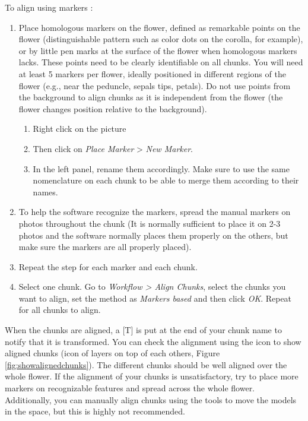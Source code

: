 \documentclass[
]{book}
\begin{document}
To align using markers :

\begin{enumerate}
\def\labelenumi{\arabic{enumi}.}
\item
  Place homologous markers on the flower, defined as remarkable points
  on the flower (distinguishable pattern such as color dots on the
  corolla, for example), or by little pen marks at the surface of the
  flower when homologous markers lacks. These points need to be
  clearly identifiable on all chunks. You will need at least 5 markers
  per flower, ideally positioned in different regions of the flower
  (e.g., near the peduncle, sepals tips, petals). Do not use points
  from the background to align chunks as it is independent from the
  flower (the flower changes position relative to the background).

  \begin{enumerate}
  \def\labelenumii{\arabic{enumii}.}
  \item
    Right click on the picture
  \item
    Then click on \emph{Place Marker} \textgreater{} \emph{New Marker}.
  \item
    In the left panel, rename them accordingly. Make sure to use the
    same nomenclature on each chunk to be able to merge them
    according to their names.
  \end{enumerate}
\item
  To help the software recognize the markers, spread the manual
  markers on photos throughout the chunk (It is normally sufficient to
  place it on 2-3 photos and the software normally places them
  properly on the others, but make sure the markers are all properly
  placed).
\item
  Repeat the step for each marker and each chunk.
\item
  Select one chunk. Go to \emph{Workflow \textgreater{} Align Chunks}, select the
  chunks you want to align, set the method as \emph{Markers based} and then
  click \emph{OK}. Repeat for all chunks to align.
\end{enumerate}

When the chunks are aligned, a {[}T{]} is put at the end of your chunk
name to notify that it is transformed. You can check the alignment using
the icon to show aligned chunks (icon of layers on top of each others,
Figure \ref{fig:showalignedchunks}). The different chunks should be well
aligned over the whole flower. If the alignment of your chunks is
unsatisfactory, try to place more markers on recognizable features and
spread across the whole flower. Additionally, you can manually align
chunks using the tools to move the models in the space, but this is
highly not recommended.
\end{document}
